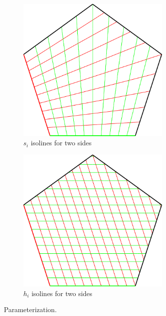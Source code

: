 \documentclass{article}
\begin{document}
\begin{figure}[b!]
\begin{subfigure}{0.30\textwidth}
\begin{minipage}[b][5cm][b]{\textwidth}
      \includegraphics[width = 0.83\textwidth]{images/s-params.pdf}
      \vspace*{9mm}
    \end{minipage}
    \caption{$s_i$ isolines for two sides}
    \label{fig:s}
  \end{subfigure}
  \hfill
  \begin{subfigure}{0.30\textwidth}
    \begin{minipage}[b][5cm][b]{\textwidth}
      \centering
      \includegraphics[width = 0.83\textwidth]{images/h-params.pdf}
      \vspace*{9mm}
    \end{minipage}
    \caption{$h_i$ isolines for two sides}
    \label{fig:h}
  \end{subfigure}
  \caption{Parameterization.}
  \label{fig:parameters}
\end{figure}
\end{document}
